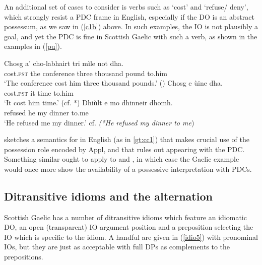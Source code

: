\documentclass[output=paper,colorlinks,citecolor=brown]{langscibook}
\begin{document}
An additional set of cases to consider is verbs such as  `cost' and  `refuse/ deny', which strongly resist a PDC frame in English, especially if the DO is an abstract possessum, as we saw in (\ref{c1b}) above. In such examples, the IO is not plausibly a goal, and yet the PDC is fine in Scottish Gaelic with such a verb, as shown in the examples in (\ref{pu}).

\ea \label{pu}
\ea
\gll Chosg a' cho-labhairt  tri m\`ile not dha. \\
cost.\textsc{pst} the conference  three thousand pound to.him \\
\glt `The conference  cost him three thousand pounds.'  \hfill (\cite{gt:Adger:1994})
\ex
\gll Chosg e ùine dha. \\
cost.\textsc{pst} it time to.him \\
\glt `It cost him time.'  \hfill   (cf. *)  
\ex \gll Dhi\`ult e mo dhinneir dhomh. \\
refused he my dinner to.me \\
\glt `He refused me my dinner.' \hfill {cf. \textit{(*He refused my dinner to me})}
\z
\z

\noindent \citet[558]{gt:Bruening:2010a} sketches a semantics for  in English (as in \ref{gt:cc1}) that makes crucial use of the possession role encoded by Appl, and that rules out appearing with the PDC. Something similar ought to apply to  and , in which case the Gaelic example would once more show the availability of a possessive interpretation with PDCs. 

\subsection{Ditransitive idioms and the  alternation}

Scottish Gaelic has a number of ditransitive idioms which feature an idiomatic DO, an open (transparent) IO argument position and a preposition selecting the IO which is specific to the idiom. A handful are given in (\ref{idio5}) with pronominal IOs, but they are just as acceptable with full DPs as complements to the prepositions.  
\end{document}
